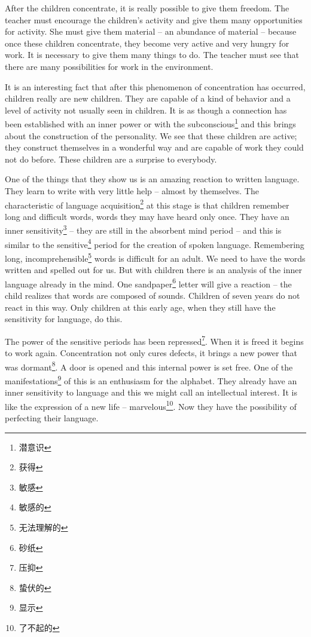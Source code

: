 \documentclass[lang=cn,10pt]{elegantbook}
\begin{document}
After the children concentrate, it is really possible to give them freedom. The teacher must encourage the children's activity and give them many opportunities for activity. She must give them material – an abundance of material – because once these children concentrate, they become very active and very hungry for work. It is necessary to give them many things to do. The teacher must see that there are many possibilities for work in the environment.

It is an interesting fact that after this phenomenon of concentration has occurred, children really are new children. They are capable of a kind of behavior and a level of activity not usually seen in children. It is as though a connection has been established with an inner power or with the subconscious\footnote{潜意识} and this brings about the construction of the personality. We see that these children are active; they construct themselves in a wonderful way and are capable of work they could not do before. These children are a surprise to everybody.

One of the things that they show us is an amazing reaction to written language. They learn to write with very little help – almost by themselves. The characteristic of language acquisition\footnote{获得} at this stage is that children remember long and difficult words, words they may have heard only once. They have an inner sensitivity\footnote{敏感} – they are still in the absorbent mind period – and this is similar to the sensitive\footnote{敏感的} period for the creation of spoken language. Remembering long, incomprehensible\footnote{无法理解的} words is difficult for an adult. We need to have the words written and spelled out for us. But with children there is an analysis of the inner language already in the mind. One sandpaper\footnote{砂纸} letter will give a reaction – the child realizes that words are composed of sounds. Children of seven years do not react in this way. Only children at this early age, when they still have the sensitivity for language, do this.

The power of the sensitive periods has been repressed\footnote{压抑}. When it is freed it begins to work again. Concentration not only cures defects, it brings a new power that was dormant\footnote{蛰伏的}. A door is opened and this internal power is set free. One of the manifestations\footnote{显示} of this is an enthusiasm for the alphabet. They already have an inner sensitivity to language and this we might call an intellectual interest. It is like the expression of a new life – marvelous\footnote{了不起的}. Now they have the possibility of perfecting their language.
\end{document}
